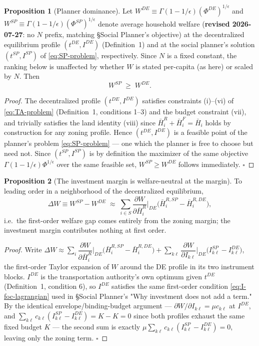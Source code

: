 \documentclass[12pt, a4paper]{article}
\theoremstyle{definition}
\newtheorem{proposition}{Proposition}
\theoremstyle{remark}
\begin{document}
\begin{proposition}[Planner dominance]
\label{prop:SP-dominance}
Let $W^{DE}\equiv \Gamma(1-1/\epsilon)(\Phi^{DE})^{1/\epsilon}$ and $W^{SP}\equiv \Gamma(1-1/\epsilon)(\Phi^{SP})^{1/\epsilon}$ denote average household welfare (\textbf{revised 2026-07-27}: no $N$ prefix, matching \S Social Planner's objective) at the decentralized equilibrium profile $(t^{DE},I^{DE})$ (Definition~1) and at the social planner's solution $(t^{SP},I^{SP})$ of \eqref{eq:SP-problem}, respectively. Since $N$ is a fixed constant, the ranking below is unaffected by whether $W$ is stated per-capita (as here) or scaled by $N$. Then
\[
W^{SP} \;\geq\; W^{DE}.
\]
\end{proposition}

\begin{proof}
The decentralized profile $(t^{DE},I^{DE})$ satisfies constraints (i)--(vi) of \eqref{eq:TA-problem} (Definition~1, conditions 1--3) and the budget constraint (vii), and trivially satisfies the land identity (viii) since $\bar H_i^{R}+\bar H_i^F=\bar H_i$ holds by construction for any zoning profile. Hence $(t^{DE},I^{DE})$ is a feasible point of the planner's problem \eqref{eq:SP-problem} — one which the planner is free to choose but need not. Since $(t^{SP},I^{SP})$ is by definition the maximizer of the same objective $\Gamma(1-1/\epsilon)\Phi^{1/\epsilon}$ over the same feasible set, $W^{SP}\geq W^{DE}$ follows immediately. \hfill$\square$
\end{proof}

\begin{proposition}[The investment margin is welfare-neutral at the margin]
\label{prop:SP-gap}
To leading order in a neighborhood of the decentralized equilibrium,
\[
\Delta W \equiv W^{SP}-W^{DE} \;\approx\; \sum_{i\in S} \frac{\partial W}{\partial \bar H_i^R}\bigg|_{DE}\bigl(\bar H_i^{R,SP}-\bar H_i^{R,DE}\bigr),
\]
i.e.\ the first-order welfare gap comes entirely from the zoning margin; the investment margin contributes nothing at first order.
\end{proposition}

\begin{proof}
Write $\Delta W \approx \sum_i \dfrac{\partial W}{\partial \bar H_i^R}\bigg|_{DE}\bigl(\bar H_i^{R,SP}-\bar H_i^{R,DE}\bigr) + \sum_{k\ell}\dfrac{\partial W}{\partial I_{k\ell}}\bigg|_{DE}\bigl(I_{k\ell}^{SP}-I_{k\ell}^{DE}\bigr)$, the first-order Taylor expansion of $W$ around the DE profile in its two instrument blocks. $I^{DE}$ is the transportation authority's own optimum given $t^{DE}$ (Definition~1, condition 6), so $I^{DE}$ satisfies the same first-order condition \eqref{eq:I-foc-lagrangian} used in \S Social Planner's "Why investment does not add a term." By the identical envelope/binding-budget argument — $\partial W/\partial I_{k\ell}=\mu c_{k\ell}$ at $I^{DE}$, and $\sum_{k\ell}c_{k\ell}(I_{k\ell}^{SP}-I_{k\ell}^{DE})=K-K=0$ since both profiles exhaust the same fixed budget $K$ — the second sum is exactly $\mu\sum_{k\ell}c_{k\ell}(I_{k\ell}^{SP}-I_{k\ell}^{DE})=0$, leaving only the zoning term. \hfill$\square$
\end{proof}
\end{document}
